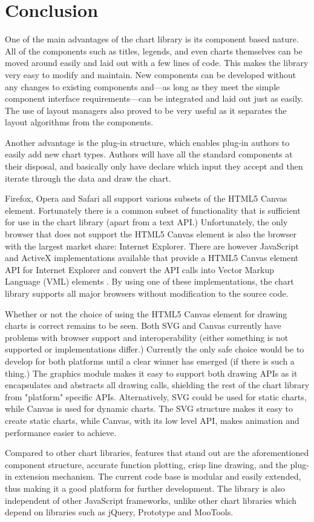 \chapter{Conclusion}

One of the main advantages of the chart library is its component based nature. All of the components such as titles, legends, and even charts themselves can be moved around easily and laid out with a few lines of code. This makes the library very easy to modify and maintain. New components can be developed without any changes to existing components and---as long as they meet the simple component interface requirements---can be integrated and laid out just as easily. The use of layout managers also proved to be very useful as it separates the layout algorithms from the components.

Another advantage is the plug-in structure, which enables plug-in authors to easily add new chart types. Authors will have all the standard components at their disposal, and basically only have declare which input they accept and then iterate through the data and draw the chart.

Firefox, Opera and Safari all support various subsets of the HTML5 Canvas element. Fortunately there is a common subset of functionality that is sufficient for use in the chart library (apart from a text API.) Unfortunately, the only browser that does not support the HTML5 Canvas element is also the browser with the largest market share: Internet Explorer. There are however JavaScript and ActiveX implementations available that provide a HTML5 Canvas element API for Internet Explorer and convert the API calls into Vector Markup Language (VML) elements \cite{google08}. By using one of these implementations, the chart library supports all major browsers without modification to the source code.

Whether or not the choice of using the HTML5 Canvas element for drawing charts is correct remains to be seen. Both SVG and Canvas currently have problems with browser support and interoperability (either something is not supported or implementations differ.) Currently the only safe choice would be to develop for both platforms until a clear winner has emerged (if there is such a thing.) The graphics module makes it easy to support both drawing APIs as it encapsulates and abstracts all drawing calls, shielding the rest of the chart library from "platform" specific APIs. Alternatively, SVG could be used for static charts, while Canvas is used for dynamic charts. The SVG structure makes it easy to create static charts, while Canvas, with its low level API, makes animation and performance easier to achieve.

Compared to other chart libraries, features that stand out are the aforementioned component structure, accurate function plotting, crisp line drawing, and the plug-in extension mechanism. The current code base is modular and easily extended, thus making it a good platform for further development. The library is also independent of other JavaScript frameworks, unlike other chart libraries which depend on libraries such as jQuery, Prototype and MooTools.


